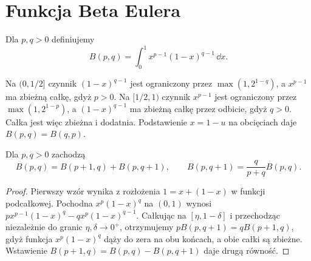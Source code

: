 \section{Funkcja Beta Eulera}
\begin{definicja}
\label{ma1:def:beta}
Dla $p,q>0$ definiujemy
\[
 B(p,q)=\int_0^1 x^{p-1}(1-x)^{q-1}\,\dd x.
\]
\end{definicja}
Na $(0,1/2]$ czynnik $(1-x)^{q-1}$ jest ograniczony przez $\max(1,2^{1-q})$, a $x^{p-1}$ ma zbieżną całkę, gdyż $p>0$. Na $[1/2,1)$ czynnik $x^{p-1}$ jest ograniczony przez $\max(1,2^{1-p})$, a $(1-x)^{q-1}$ ma zbieżną całkę przez odbicie, gdyż $q>0$. Całka jest więc zbieżna i dodatnia. Podstawienie $x=1-u$ na obcięciach daje $B(p,q)=B(q,p)$.
\begin{twierdzenie}
\label{ma1:thm:beta-recurrence}
Dla $p,q>0$ zachodzą
\[
 B(p,q)=B(p+1,q)+B(p,q+1),\qquad
 B(p,q+1)=\frac{q}{p+q}B(p,q).
\]
\end{twierdzenie}
\begin{proof}
Pierwszy wzór wynika z rozłożenia $1=x+(1-x)$ w funkcji podcałkowej. Pochodna $x^p(1-x)^q$ na $(0,1)$ wynosi
$p x^{p-1}(1-x)^q-q x^p(1-x)^{q-1}$. Całkując na $[\eta,1-\delta]$ i przechodząc niezależnie do granic $\eta,\delta\to0^+$, otrzymujemy
$pB(p,q+1)=qB(p+1,q)$, gdyż funkcja $x^p(1-x)^q$ dąży do zera na obu końcach, a obie całki są zbieżne. Wstawienie $B(p+1,q)=B(p,q)-B(p,q+1)$ daje drugą równość.
\end{proof}

